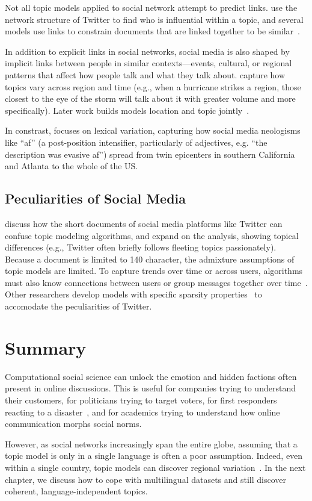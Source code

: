 Not all topic models applied to social network attempt to predict
links.  \citet{weng-10} use the network structure of Twitter to find
who is influential within a topic, and several models use links to
constrain documents that are linked together to be
similar~\citep{mei-08,sun-09,daume-09}.

In addition to explicit links in social networks, social media is also
shaped by implicit links between people in similar contexts---events,
cultural, or regional patterns that affect how people talk and what
they talk about.  \citet{mei-06} capture how topics vary across region
and time (e.g., when a hurricane strikes a region, those closest to
the eye of the storm will talk about it with greater volume and more
specifically).  Later work builds models location and topic
jointly~\citep{yin-11}.

In constrast, \citet{eisenstein-17} focuses on lexical variation,
capturing how social media neologisms like ``af'' (a post-position
intensifier, particularly of adjectives, e.g. ``the description was
evasive af'') spread from twin epicenters in southern California and
Atlanta to the whole of the US.

\subsection{Peculiarities of Social Media}
\label{sec:twitter-strange}

\citet{hong-10} discuss how the short documents of social media
platforms like Twitter can confuse topic modeling algorithms, and
\citet{zhao-11} expand on the analysis, showing topical differences
(e.g., Twitter often briefly follows fleeting topics passionately).
Because a document is limited to 140 character, the admixture
assumptions of topic models are limited.  To capture trends over time
or across users, algorithms must also know connections between users
or group messages together over time~\citep{mehrotra-13}.  Other
researchers develop models with specific sparsity
properties~\citep{lin-14} to accomodate the peculiarities of Twitter.

\section{Summary}
\label{sec:css-summary}

Computational social science can unlock the emotion and hidden
factions often present in online discussions.  This is useful for
companies trying to understand their customers, for politicians trying
to target voters, for first responders reacting to a
disaster~\citep{kireyev-09}, and for academics trying to understand
how online communication morphs social norms.

However, as social networks increasingly span the entire globe,
assuming that a topic model is only in a single language is often a
poor assumption.  Indeed, even within a single country, topic models
can discover regional variation~\citep{eisenstein-10}.  In the next
chapter, we discuss how to cope with multilingual datasets and still
discover coherent, language-independent topics.


